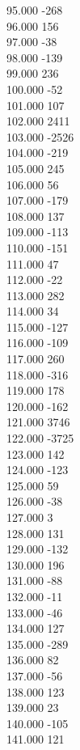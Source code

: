 { 95.000	-268 \\
 96.000	156 \\
 97.000	-38 \\
 98.000	-139 \\
 99.000	236 \\
 100.000	-52 \\
 101.000	107 \\
 102.000	2411 \\
 103.000	-2526 \\
 104.000	-219 \\
 105.000	245 \\
 106.000	56 \\
 107.000	-179 \\
 108.000	137 \\
 109.000	-113 \\
 110.000	-151 \\
 111.000	47 \\
 112.000	-22 \\
 113.000	282 \\
 114.000	34 \\
 115.000	-127 \\
 116.000	-109 \\
 117.000	260 \\
 118.000	-316 \\
 119.000	178 \\
 120.000	-162 \\
 121.000	3746 \\
 122.000	-3725 \\
 123.000	142 \\
 124.000	-123 \\
 125.000	59 \\
 126.000	-38 \\
 127.000	3 \\
 128.000	131 \\
 129.000	-132 \\
 130.000	196 \\
 131.000	-88 \\
 132.000	-11 \\
 133.000	-46 \\
 134.000	127 \\
 135.000	-289 \\
 136.000	82 \\
 137.000	-56 \\
 138.000	123 \\
 139.000	23 \\
 140.000	-105 \\
 141.000	121 \\
}
